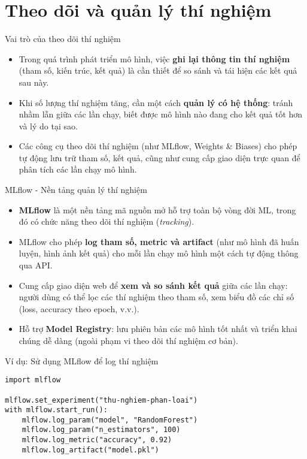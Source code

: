 \documentclass{beamer}
\begin{document}
\section{Theo dõi và quản lý thí nghiệm}

\begin{frame}{Vai trò của theo dõi thí nghiệm}
    \begin{itemize}
        \item Trong quá trình phát triển mô hình, việc \textbf{ghi lại thông tin thí nghiệm} (tham số, kiến trúc, kết quả) là cần thiết để so sánh và tái hiện các kết quả sau này.
        \item Khi số lượng thí nghiệm tăng, cần một cách \textbf{quản lý có hệ thống}: tránh nhầm lẫn giữa các lần chạy, biết được mô hình nào đang cho kết quả tốt hơn và lý do tại sao.
        \item Các công cụ theo dõi thí nghiệm (như MLflow, Weights \& Biases) cho phép tự động lưu trữ tham số, kết quả, cũng như cung cấp giao diện trực quan để phân tích các lần chạy mô hình.
    \end{itemize}
\end{frame}

\begin{frame}{MLflow - Nền tảng quản lý thí nghiệm}
    \begin{itemize}
        \item \textbf{MLflow} là một nền tảng mã nguồn mở hỗ trợ toàn bộ vòng đời ML, trong đó có chức năng theo dõi thí nghiệm (\textit{tracking}).
        \item MLflow cho phép \textbf{log tham số, metric và artifact} (như mô hình đã huấn luyện, hình ảnh kết quả) cho mỗi lần chạy mô hình một cách tự động thông qua API.
        \item Cung cấp giao diện web để \textbf{xem và so sánh kết quả} giữa các lần chạy: người dùng có thể lọc các thí nghiệm theo tham số, xem biểu đồ các chỉ số (loss, accuracy theo epoch, v.v.).
        \item Hỗ trợ \textbf{Model Registry}: lưu phiên bản các mô hình tốt nhất và triển khai chúng dễ dàng (ngoài phạm vi theo dõi thí nghiệm cơ bản).
    \end{itemize}
\end{frame}

\begin{frame}[fragile]{Ví dụ: Sử dụng MLflow để log thí nghiệm}
\begin{verbatim}
import mlflow

mlflow.set_experiment("thu-nghiem-phan-loai")
with mlflow.start_run():
    mlflow.log_param("model", "RandomForest")
    mlflow.log_param("n_estimators", 100)
    mlflow.log_metric("accuracy", 0.92)
    mlflow.log_artifact("model.pkl")
\end{verbatim}
\end{frame}
\end{document}
